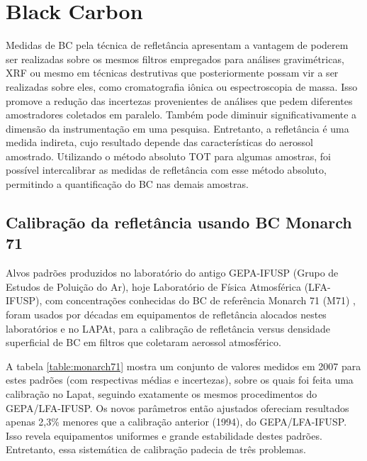 \section{Black Carbon}

Medidas de BC pela técnica de refletância apresentam a vantagem de poderem ser 
realizadas sobre os mesmos filtros empregados para análises gravimétricas, 
XRF ou mesmo em técnicas destrutivas que posteriormente possam vir a ser 
realizadas sobre eles, como cromatografia iônica ou espectroscopia de massa. 
Isso promove a redução das incertezas provenientes de análises que pedem 
diferentes amostradores coletados em paralelo. Também pode diminuir 
significativamente a dimensão da instrumentação em uma pesquisa. Entretanto, 
a refletância é uma medida indireta, cujo resultado depende das características 
do aerossol amostrado. Utilizando o método absoluto TOT para algumas amostras, 
foi possível intercalibrar as medidas de refletância com esse método absoluto, 
permitindo a quantificação do BC nas demais amostras.

\subsection{Calibração da refletância usando BC Monarch 71}

Alvos padrões produzidos no laboratório do antigo GEPA-IFUSP (Grupo de Estudos 
de Poluição do Ar), hoje Laboratório de Física Atmosférica (LFA-IFUSP), 
com concentrações conhecidas do BC de referência Monarch 71 (M71) 
\citep{clarke1986}, foram usados por décadas em equipamentos de refletância 
alocados nestes laboratórios e no LAPAt, para a calibração de refletância versus
densidade superficial de BC em filtros que coletaram aerossol atmosférico.

A tabela \ref{table:monarch71} mostra um conjunto de valores medidos em 2007 
para estes padrões (com respectivas médias e incertezas), sobre os quais foi 
feita uma calibração no Lapat, seguindo exatamente os mesmos procedimentos do 
GEPA/LFA-IFUSP. Os novos parâmetros então ajustados ofereciam resultados 
apenas 2,3\% menores que a calibração anterior (1994), do GEPA/LFA-IFUSP. 
Isso revela equipamentos uniformes e grande estabilidade destes padrões. 
Entretanto, essa sistemática de calibração padecia de três problemas.

